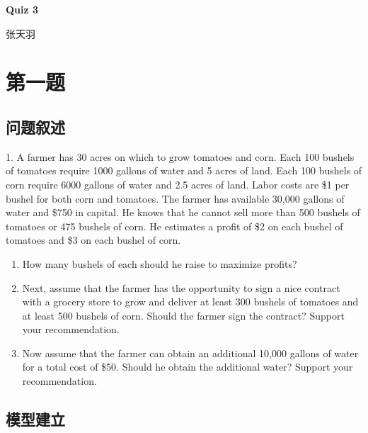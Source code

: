﻿\documentclass[UTF8,zihao=-4,fontset=none]{ctexart}
\newcommand{\studentname}{张天羽}
\newcommand{\quiztitle}{Quiz 3}
\begin{document}

\thispagestyle{coverstyle}
\begin{center}
  \vspace*{1.1cm}
  {\bfseries \quiztitle\par}
  \vspace{0.7cm}
  {\studentname\par}
\end{center}
\vspace{0.4cm}
\tableofcontents

\clearpage
\pagestyle{mainstyle}

\section{第一题}

\subsection{问题叙述}

1. A farmer has 30 acres on which to grow tomatoes and corn. Each 100 bushels of tomatoes require 1000 gallons of water and 5 acres of land. Each 100 bushels of corn require 6000 gallons of water and 2.5 acres of land. Labor costs are \$1 per bushel for both corn and tomatoes. The farmer has available 30,000 gallons of water and \$750 in capital. He knows that he cannot sell more than 500 bushels of tomatoes or 475 bushels of corn. He estimates a profit of \$2 on each bushel of tomatoes and \$3 on each bushel of corn.

\begin{enumerate}[label=\alph*.,leftmargin=2.3em]
  \item How many bushels of each should he raise to maximize profits?
  \item Next, assume that the farmer has the opportunity to sign a nice contract with a grocery store to grow and deliver at least 300 bushels of tomatoes and at least 500 bushels of corn. Should the farmer sign the contract? Support your recommendation.
  \item Now assume that the farmer can obtain an additional 10,000 gallons of water for a total cost of \$50. Should he obtain the additional water? Support your recommendation.
\end{enumerate}

\subsection{模型建立}
\end{document}
